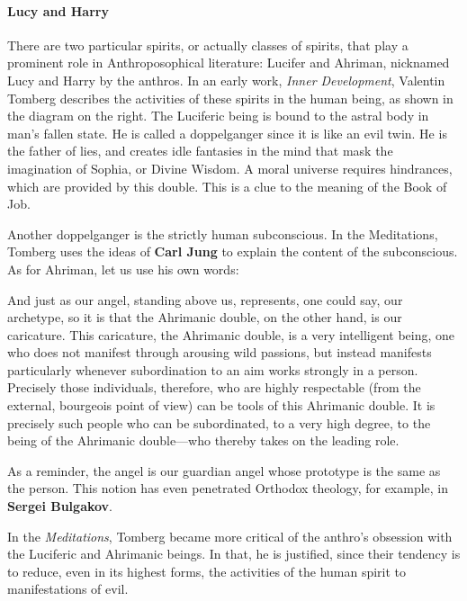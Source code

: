 \paragraph{Lucy and Harry}

\hfill

There are two particular spirits, or actually classes of spirits, that play a prominent role in Anthroposophical literature: Lucifer and Ahriman, nicknamed Lucy and Harry by the anthros. In an early work, \emph{Inner Development}, Valentin Tomberg describes the activities of these spirits in the human being, as shown in the diagram on the right. The Luciferic being is bound to the astral body in man's fallen state. He is called a doppelganger since it is like an evil twin. He is the father of lies, and creates idle fantasies in the mind that mask the imagination of Sophia, or Divine Wisdom. A moral universe requires hindrances, which are provided by this double. This is a clue to the meaning of the Book of Job.

Another doppelganger is the strictly human subconscious. In the Meditations, Tomberg uses the ideas of \textbf{Carl Jung} to explain the content of the subconscious. As for Ahriman, let us use his own words:

\begin{quotex}
And just as our angel, standing above us, represents, one could say, our archetype, so it is that the Ahrimanic double, on the other hand, is our caricature. This caricature, the Ahrimanic double, is a very intelligent being, one who does not manifest through arousing wild passions, but instead manifests particularly whenever subordination to an aim works strongly in a person. Precisely those individuals, therefore, who are highly respectable (from the external, bourgeois point of view) can be tools of this Ahrimanic double. It is precisely such people who can be subordinated, to a very high degree, to the being of the Ahrimanic double—who thereby takes on the leading role. 

\end{quotex}
As a reminder, the angel is our guardian angel whose prototype is the same as the person. This notion has even penetrated Orthodox theology, for example, in \textbf{Sergei Bulgakov}.

In the \textit{Meditations}, Tomberg became more critical of the anthro's obsession with the Luciferic and Ahrimanic beings. In that, he is justified, since their tendency is to reduce, even in its highest forms, the activities of the human spirit to manifestations of evil.

